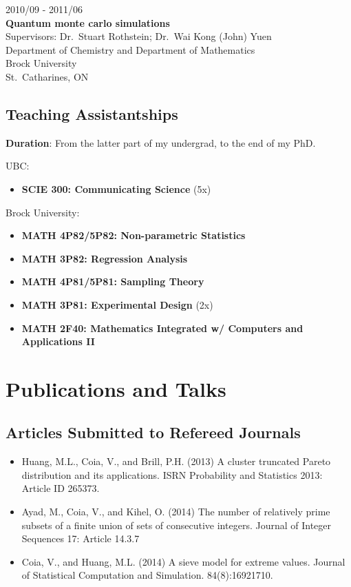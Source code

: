 \documentclass[]{book}
\providecommand{\tightlist}{%
  \setlength{\itemsep}{0pt}\setlength{\parskip}{0pt}}
\begin{document}
2010/09 - 2011/06\\
\textbf{Quantum monte carlo simulations}\\
Supervisors: Dr.~Stuart Rothstein; Dr.~Wai Kong (John) Yuen\\
Department of Chemistry and Department of Mathematics\\
Brock University\\
St.~Catharines, ON

\hypertarget{teaching-assistantships}{%
\subsection{Teaching Assistantships}\label{teaching-assistantships}}

\textbf{Duration}: From the latter part of my undergrad, to the end of my PhD.

UBC:

\begin{itemize}
\tightlist
\item
  \textbf{SCIE 300: Communicating Science} (5x)
\end{itemize}

Brock University:

\begin{itemize}
\tightlist
\item
  \textbf{MATH 4P82/5P82: Non-parametric Statistics}
\item
  \textbf{MATH 3P82: Regression Analysis}
\item
  \textbf{MATH 4P81/5P81: Sampling Theory}
\item
  \textbf{MATH 3P81: Experimental Design} (2x)
\item
  \textbf{MATH 2F40: Mathematics Integrated w/ Computers and Applications II}
\end{itemize}

\hypertarget{publications-and-talks}{%
\section{Publications and Talks}\label{publications-and-talks}}

\hypertarget{articles-submitted-to-refereed-journals}{%
\subsection{Articles Submitted to Refereed Journals}\label{articles-submitted-to-refereed-journals}}

\begin{itemize}
\item
  Huang, M.L., Coia, V., and Brill, P.H. (2013) A cluster truncated
  Pareto distribution and its applications. ISRN Probability and
  Statistics 2013: Article ID 265373.
\item
  Ayad, M., Coia, V., and Kihel, O. (2014) The number of relatively
  prime subsets of a finite union of sets of consecutive integers.
  Journal of Integer Sequences 17: Article 14.3.7
\item
  Coia, V., and Huang, M.L. (2014) A sieve model for extreme
  values. Journal of Statistical Computation and Simulation.
  84(8):16921710.
\end{itemize}
\end{document}
